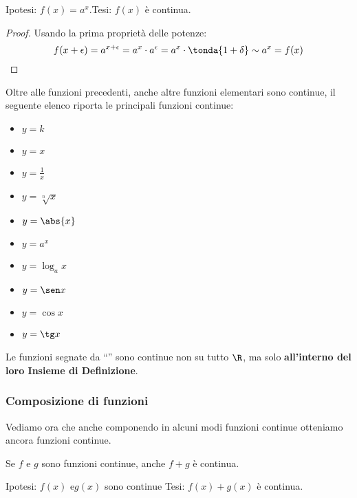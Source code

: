\noindent Ipotesi: \(f(x)=a^x\).\tab Tesi: \(f(x)\) è continua.

\begin{proof}
Usando la prima proprietà delle potenze:
\[f(x+\epsilon) =
a^{x+\epsilon} = a^{x} \cdot a^{\epsilon} = a^{x} \cdot \tonda{1 + \delta} 
\sim a^{x} = f(x)\]
\end{proof}

Oltre alle funzioni precedenti, anche altre funzioni elementari sono continue, 
il seguente elenco riporta le principali funzioni continue:
\begin{multicols}{4}
\begin{itemize} [noitemsep]
 \item \(y=k\)
 \item \(y=x\)
 \item \(y=\frac{1}{x}\) ~ \textasteriskcentered
 \item \(y=\sqrt[n]{x}\) ~ \textasteriskcentered
 \item \(y=\abs{x}\)
 \item \(y=a^x\)
 \item \(y=\log_a x\) ~ \textasteriskcentered
 \item \(y=\sen x\)
 \item \(y=\cos x\)
 \item \(y=\tg x\) ~ \textasteriskcentered
\end{itemize}
\end{multicols}

\begin{osservazione}
Le funzioni segnate da ``\textasteriskcentered'' sono continue non su 
tutto \(\R\), 
ma solo \textbf{all'interno del loro Insieme di Definizione}.
\end{osservazione}

\subsubsection{Composizione di funzioni}
\label{subsubsec:cont_composizionefunzioni}

Vediamo ora che anche componendo in alcuni modi funzioni continue otteniamo 
ancora funzioni continue.

\begin{teorema}
Se \(f\) e \(g\) sono funzioni continue, anche \(f+g\) è continua.
\end{teorema}

\noindent Ipotesi: 
\(f(x) \text{ e} g(x)\) sono continue
\tab Tesi: 
\(f(x)+g(x)\) è continua.

